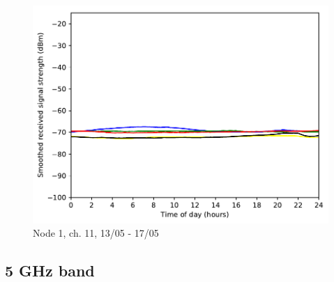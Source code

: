 \documentclass[a4paper, 11pt]{article}
\begin{document}
\begin{figure}[h!]
\begin{minipage}{0.47\textwidth}
    \centering
	\includegraphics[width=\textwidth]{images/2_4_GHz/node1_2017-05-17_chan11_image}
    \caption{Node 1, ch. 11, 13/05 - 17/05} \label{node1-11}
\end{minipage}\hfill
\end{figure}
\newpage
\subsection{5 GHz band}
\end{document}
